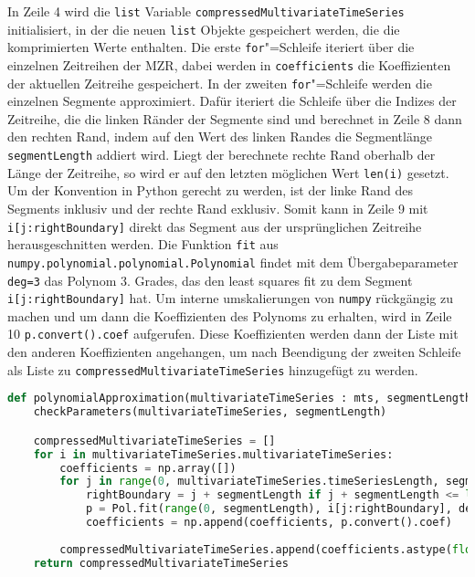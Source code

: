 In Zeile 4 wird die \lstinline|list| Variable \lstinline|compressedMultivariateTimeSeries| initialisiert, in der die neuen \lstinline|list| Objekte gespeichert werden, die die komprimierten Werte enthalten. Die erste \lstinline|for|"=Schleife iteriert über die einzelnen Zeitreihen der \ac{MZR}, dabei werden in \texttt{coeffi\allowbreak cients} die Koeffizienten der aktuellen Zeitreihe gespeichert. In der zweiten \lstinline|for|"=Schleife werden die einzelnen Segmente approximiert. Dafür iteriert die Schleife über die Indizes der Zeitreihe, die die linken Ränder der Segmente sind und berechnet in Zeile 8 dann den rechten Rand, indem auf den Wert des linken Randes die Segmentlänge \lstinline|segmentLength| addiert wird. Liegt der berechnete rechte Rand oberhalb der Länge der Zeitreihe, so wird er auf den letzten möglichen Wert \lstinline|len(i)| gesetzt. Um der Konvention in Python gerecht zu werden, ist der linke Rand des Segments inklusiv und der rechte Rand exklusiv. Somit kann in Zeile 9 mit \lstinline|i[j:rightBoundary]| direkt das Segment aus der ursprünglichen Zeitreihe herausgeschnitten werden. Die Funktion \lstinline|fit| aus \lstinline|numpy.polynomial.polynomial.Polynomial| findet mit dem Übergabeparameter \lstinline|deg=3| das Polynom 3. Grades, das den least squares fit zu dem Segment \lstinline|i[j:rightBoundary]| hat. Um interne umskalierungen von \lstinline|numpy| rückgängig zu machen und um dann die Koeffizienten des Polynoms zu erhalten, wird in Zeile 10 \lstinline|p.convert().coef| aufgerufen. Diese Koeffizienten werden dann der Liste mit den anderen Koeffizienten angehangen, um nach Beendigung der zweiten Schleife als Liste zu \lstinline|compressedMultivariateTimeSeries| hinzugefügt zu werden.
\begin{lstlisting}[caption=Stückweise polynomielle Approximation, label=lst:stückweisepolynomielleapproximation, style=Python, language=Python]
def polynomialApproximation(multivariateTimeSeries : mts, segmentLength : int):
    checkParameters(multivariateTimeSeries, segmentLength)

    compressedMultivariateTimeSeries = []
    for i in multivariateTimeSeries.multivariateTimeSeries:
        coefficients = np.array([])
        for j in range(0, multivariateTimeSeries.timeSeriesLength, segmentLength):
            rightBoundary = j + segmentLength if j + segmentLength <= len(i) else len(i)
            p = Pol.fit(range(0, segmentLength), i[j:rightBoundary], deg=3)
            coefficients = np.append(coefficients, p.convert().coef)
        
        compressedMultivariateTimeSeries.append(coefficients.astype(float).tolist())
    return compressedMultivariateTimeSeries
\end{lstlisting}

